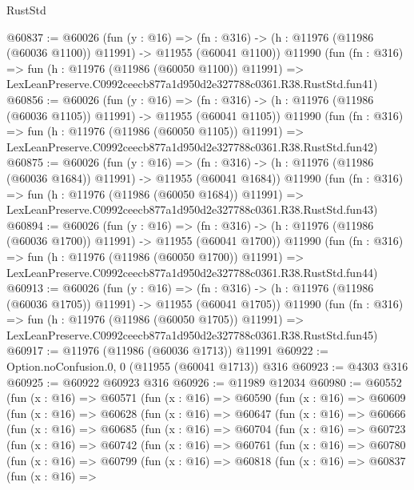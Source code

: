 \begin{lexlean}{RustStd}
\begin{coremodule}
@60837 := @60026
    (fun (y : @16) =>
    (fn : @316) -> (h : @11976 (@11986 (@60036 @1100)) @11991) -> @11955 (@60041 @1100))
    @11990
    (fun (fn : @316) =>
    fun (h : @11976 (@11986 (@60050 @1100)) @11991) =>
    LexLeanPreserve.C0992ceecb877a1d950d2e327788c0361.R38.RustStd.fun41)
@60856 := @60026
    (fun (y : @16) =>
    (fn : @316) -> (h : @11976 (@11986 (@60036 @1105)) @11991) -> @11955 (@60041 @1105))
    @11990
    (fun (fn : @316) =>
    fun (h : @11976 (@11986 (@60050 @1105)) @11991) =>
    LexLeanPreserve.C0992ceecb877a1d950d2e327788c0361.R38.RustStd.fun42)
@60875 := @60026
    (fun (y : @16) =>
    (fn : @316) -> (h : @11976 (@11986 (@60036 @1684)) @11991) -> @11955 (@60041 @1684))
    @11990
    (fun (fn : @316) =>
    fun (h : @11976 (@11986 (@60050 @1684)) @11991) =>
    LexLeanPreserve.C0992ceecb877a1d950d2e327788c0361.R38.RustStd.fun43)
@60894 := @60026
    (fun (y : @16) =>
    (fn : @316) -> (h : @11976 (@11986 (@60036 @1700)) @11991) -> @11955 (@60041 @1700))
    @11990
    (fun (fn : @316) =>
    fun (h : @11976 (@11986 (@60050 @1700)) @11991) =>
    LexLeanPreserve.C0992ceecb877a1d950d2e327788c0361.R38.RustStd.fun44)
@60913 := @60026
    (fun (y : @16) =>
    (fn : @316) -> (h : @11976 (@11986 (@60036 @1705)) @11991) -> @11955 (@60041 @1705))
    @11990
    (fun (fn : @316) =>
    fun (h : @11976 (@11986 (@60050 @1705)) @11991) =>
    LexLeanPreserve.C0992ceecb877a1d950d2e327788c0361.R38.RustStd.fun45)
@60917 := @11976 (@11986 (@60036 @1713)) @11991
@60922 := Option.noConfusion.{0, 0} (@11955 (@60041 @1713)) @316
@60923 := @4303 @316
@60925 := @60922 @60923 @316
@60926 := @11989 @12034
@60980 := @60552
    (fun (x : @16) =>
    @60571
      (fun (x : @16) =>
      @60590
        (fun (x : @16) =>
        @60609
          (fun (x : @16) =>
          @60628
            (fun (x : @16) =>
            @60647
              (fun (x : @16) =>
              @60666
                (fun (x : @16) =>
                @60685
                  (fun (x : @16) =>
                  @60704
                    (fun (x : @16) =>
                    @60723
                      (fun (x : @16) =>
                      @60742
                        (fun (x : @16) =>
                        @60761
                          (fun (x : @16) =>
                          @60780
                            (fun (x : @16) =>
                            @60799
                              (fun (x : @16) =>
                              @60818
                                (fun (x : @16) =>
                                @60837
                                  (fun (x : @16) =>

\end{coremodule}
\end{lexlean}
